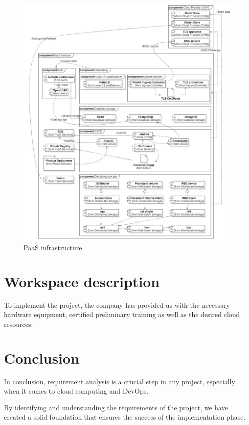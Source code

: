 \begin{figure}[H]\centering
\includegraphics[width=1.0\textwidth,angle=00]{assets/f8.jpg}
\caption{PaaS infrastructure}
\label{fig:f8}
\end{figure}

\section{Workspace description}

To implement the project, the company has provided us with the necessary hardware equipment, certified preliminary training as well as the desired cloud resources.

\section*{Conclusion}
In conclusion, requirement analysis is a crucial step in any project, especially when it comes to cloud computing and DevOps.  

By identifying and understanding the requirements of the project, we have created a solid foundation that ensures the success of the implementation phase. 


